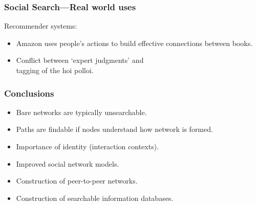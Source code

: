 \begin{frame}
  \frametitle{Social Search---Real world uses}

  \begin{block}{Recommender systems:}
    \begin{itemize}
    \item<1->
      Amazon uses people's actions to build
      effective connections between books.  
    \item<2->
      Conflict between `expert judgments' and\\
      tagging of the hoi polloi.
    \end{itemize}
  \end{block}



\end{frame}

\begin{frame}

  \frametitle{Conclusions}

  \begin{itemize}
  \item<1->
    Bare networks are typically unsearchable.
  \item<2-> 
    Paths are findable if nodes understand how network is formed.
  \item<3-> 
    Importance of identity (interaction contexts).
  \item<4-> 
    Improved social network models.
  \item<5-> 
    Construction of peer-to-peer networks.
  \item<6-> 
    Construction of searchable information databases.
  \end{itemize}

\end{frame}



